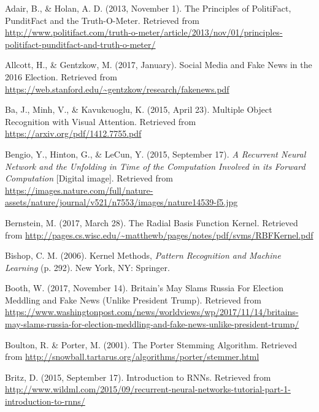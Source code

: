 \clearpage



\fancyhead[RO]{}

\begin{thebibliography}{99}
\raggedright


Adair, B., \& Holan, A. D. (2013, November 1). The Principles of PolitiFact, PunditFact and the Truth-O-Meter. Retrieved from \url{http://www.politifact.com/truth-o-meter/article/2013/nov/01/principles-politifact-punditfact-and-truth-o-meter/}

Allcott, H., \& Gentzkow, M. (2017, January). Social Media and Fake News in the 2016 Election. Retrieved from \url{https://web.stanford.edu/~gentzkow/research/fakenews.pdf}

Ba, J., Minh, V., \& Kavukcuoglu, K. (2015, April 23). Multiple Object Recognition with Visual Attention. Retrieved from \url{https://arxiv.org/pdf/1412.7755.pdf}

Bengio, Y., Hinton, G., \& LeCun, Y. (2015, September 17). \textit{A Recurrent Neural Network and the Unfolding in Time of the Computation Involved in its Forward Computation} [Digital image]. Retrieved from \url{https://images.nature.com/full/nature-assets/nature/journal/v521/n7553/images/nature14539-f5.jpg}

Bernstein, M. (2017, March 28). The Radial Basis Function Kernel. Retrieved from \url{http://pages.cs.wisc.edu/~matthewb/pages/notes/pdf/svms/RBFKernel.pdf}

Bishop, C. M. (2006). Kernel Methods, \textit{Pattern Recognition and Machine Learning} (p. 292). New York, NY: Springer.

Booth, W. (2017, November 14). Britain's May Slams Russia For Election Meddling and Fake News (Unlike President Trump). Retrieved from \url{https://www.washingtonpost.com/news/worldviews/wp/2017/11/14/britains-may-slams-russia-for-election-meddling-and-fake-news-unlike-president-trump/}

Boulton, R. \& Porter, M. (2001). The Porter Stemming Algorithm. Retrieved from \url{http://snowball.tartarus.org/algorithms/porter/stemmer.html}

Britz, D. (2015, September 17). Introduction to RNNs. Retrieved from \url{http://www.wildml.com/2015/09/recurrent-neural-networks-tutorial-part-1-introduction-to-rnns/}


\end{thebibliography}
